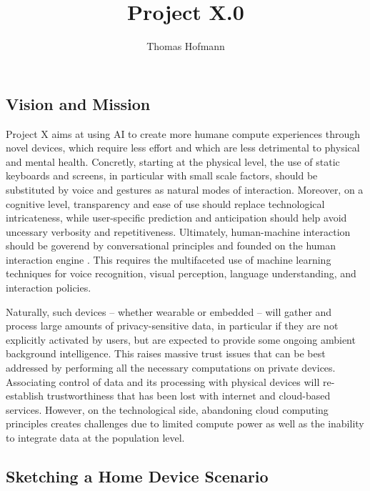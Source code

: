 \documentclass{article}
\title{Project X.0}
\author{Thomas Hofmann}
\begin{document}
\maketitle

\subsection*{Vision and Mission}

Project X aims at using  AI to create more humane compute experiences through novel devices, which require less effort and which are less detrimental to physical and mental health. Concretly, starting at the physical level, the use of static keyboards and screens, in particular with small scale factors, should be substituted by voice and gestures as natural modes of interaction. Moreover, on a cognitive level, transparency and ease of use should replace technological intricateness, while user-specific prediction and anticipation should help avoid uncessary verbosity and repetitiveness. Ultimately, human-machine interaction should be goverend by conversational principles and founded on the human interaction engine \cite{levinson2006human}. This requires the multifaceted use of machine learning techniques for voice recognition, visual perception, language understanding, and interaction policies. 

Naturally, such devices -- whether wearable or embedded -- will gather and process large amounts of privacy-sensitive data, in particular if they  are not explicitly activated by users, but are expected to provide some ongoing ambient background intelligence. This raises massive trust issues that can be best addressed by performing all the necessary computations on private devices. Associating control of data and its processing with physical devices will re-establish trustworthiness that has been lost with internet and cloud-based services. However, on the technological side, abandoning cloud computing principles creates challenges due to limited compute power as well as the inability to integrate data at  the population level.

\subsection*{Sketching a Home Device Scenario}
\end{document}
